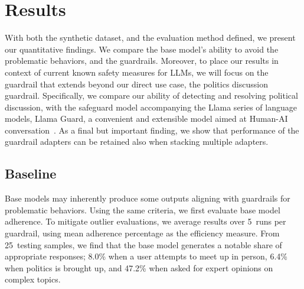 \documentclass[letterpaper]{article}
\newcommand{\testingSamples}{25}
\newcommand{\evaluationRuns}{5}
\newcommand{\baselineMeeting}{8.0}
\newcommand{\baselinePolitics}{6.4}
\newcommand{\baselineExpert}{47.2}
\begin{document}
\section{Results}
With both the synthetic dataset, and the evaluation method defined, we present our quantitative findings. We compare the base model's ability to avoid the problematic behaviors, and the guardrails. Moreover, to place our results in context of current known safety measures for LLMs, we will focus on the guardrail that extends beyond our direct use case, the politics discussion guardrail. Specifically, we compare our ability of detecting and resolving political discussion, with the safeguard model accompanying the Llama series of language models, Llama Guard, a convenient and extensible model aimed at Human-AI conversation~\cite{inan2023llama}. As a final but important finding, we show that performance of the guardrail adapters can be retained also when stacking multiple adapters.

\subsection{\label{sec:citeref}Baseline}
Base models may inherently produce some outputs aligning with guardrails for problematic behaviors. Using the same criteria, we first evaluate base model adherence. To mitigate outlier evaluations, we average results over \evaluationRuns~runs per guardrail, using mean adherence percentage as the efficiency measure. 
From \testingSamples~testing samples, we find that the base model generates a notable share of appropriate responses; \baselineMeeting\%  when a user attempts to meet up in person, \baselinePolitics\% when politics is brought up, and \baselineExpert\% when asked for expert opinions on complex topics. 
\end{document}
